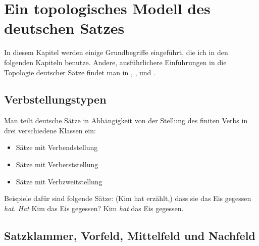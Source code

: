 

\chapter{Ein topologisches Modell des deutschen Satzes}
\label{topo}

%
In diesem Kapitel werden einige Grundbegriffe eingeführt, die ich in den folgenden
Kapiteln benutze. 
Andere, ausführlichere Einführungen in die Topologie deutscher Sätze
findet man in , ,  und .

\section{Verbstellungstypen}

Man teilt deutsche Sätze in Abhängigkeit von der Stellung des finiten Verbs 
in drei verschiedene Klassen ein:
\begin{itemize}
\item Sätze mit Verbendstellung
\item Sätze mit Verberststellung
\item Sätze mit Verbzweitstellung
\end{itemize}
Beispiele dafür sind folgende Sätze:
\eal
\ex (Kim hat erzählt,) dass sie das Eis gegessen \emph{hat}.
\ex \emph{Hat} Kim das Eis gegessen?
\ex Kim \emph{hat} das Eis gegessen.
\zl

% 
%



\section{Satzklammer, Vorfeld, Mittelfeld und Nachfeld}

